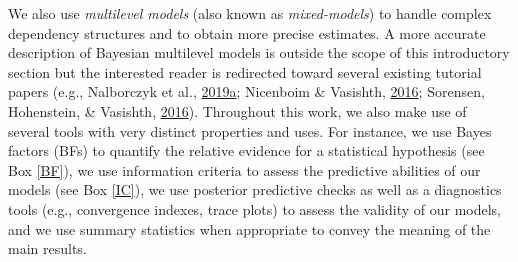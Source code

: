 \documentclass[a4paper,12pt,twoside,openright,oldfontcommands]{memoir}
\begin{document}
We also use \emph{multilevel models} (also known as \emph{mixed-models}) to handle complex dependency structures and to obtain more precise estimates. A more accurate description of Bayesian multilevel models is outside the scope of this introductory section but the interested reader is redirected toward several existing tutorial papers (e.g., Nalborczyk et al., \protect\hyperlink{ref-nalborczyk_introduction_2019}{2019}\protect\hyperlink{ref-nalborczyk_introduction_2019}{a}; Nicenboim \& Vasishth, \protect\hyperlink{ref-nicenboim_statistical_2016}{2016}; Sorensen, Hohenstein, \& Vasishth, \protect\hyperlink{ref-sorensen_bayesian_2016}{2016}). Throughout this work, we also make use of several tools with very distinct properties and uses. For instance, we use Bayes factors (BFs) to quantify the relative evidence for a statistical hypothesis (see Box \ref{BF}), we use information criteria to assess the predictive abilities of our models (see Box \ref{IC}), we use posterior predictive checks as well as a diagnostics tools (e.g., convergence indexes, trace plots) to assess the validity of our models, and we use summary statistics when appropriate to convey the meaning of the main results.

\vspace{2mm}
\end{document}
